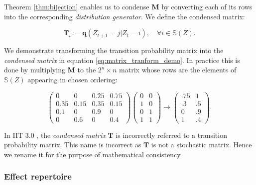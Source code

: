 Theorem \ref{thm:bijection} enables us to condense $\mathbf{M}$ by converting each of its rows into the corresponding \textit{distribution generator}. We define the condensed matrix:

\begin{equation}
\label{def:generators}
\mathbf{T}_{i} := \mathbf{q}(Z_{t+1} = j| Z_t = i) , \quad \forall i \in \mathbb{S}(Z).
\end{equation}

We demonstrate transforming the transition probability matrix into the \textit{condensed matrix} in equation \ref{eq:matrix_tranform_demo}. In practice this is done by multiplying $\mathbf{M}$ to the $2^n \times n$ matrix whose rows are the elements of $\mathbb{S}(Z)$ appearing in chosen ordering:



\begin{equation}
\label{eq:matrix_tranform_demo}
\left( \begin{array}{cccc} 0&0&0.25&0.75\\
							0.35&0.15&0.35&0.15\\
							0.1&0&0.9&0\\
							0&0.6&0&0.4
							\end{array} \right) 							
\left(\begin{array}{cc}0&0\\
1&0\\
0&1\\
1&1 \end{array} \right)
\rightarrow \left( \begin{array}{cc}.75&1\\
											.3&.5\\
											0&.9\\
											1&.4 \end{array} \right).
\end{equation}

\begin{remark}
	In IIT 3.0 \cite{oizumi2014phenomenology}, the \textit{condensed matrix} $\mathbf{T}$ is incorrectly referred to a transition probability matrix. This name is incorrect as $\mathbf{T}$ is not a stochastic matrix. Hence we rename it for the purpose of mathematical consistency.
\end{remark}

\subsubsection{Effect repertoire}

